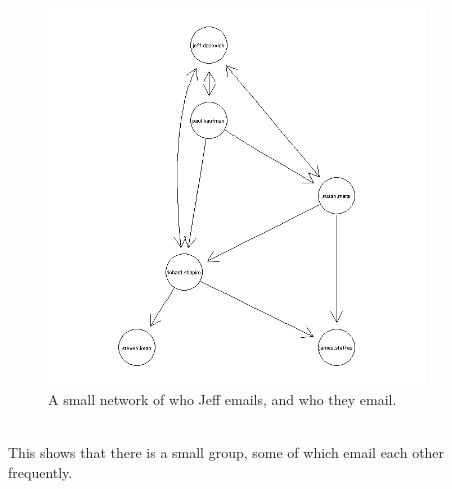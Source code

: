 \documentclass[12pt, a4paper, oneside]{amsart}
\begin{document}
\begin{figure}[htp]
\centering
\includegraphics[width = 100mm]{JeffPlot2.jpeg}
\caption{A small network of who Jeff emails, and who they email.}\label{fig:JeffNetwork}
\end{figure}\\
This shows that there is a small group, some of which email each other frequently. 
\end{document}
